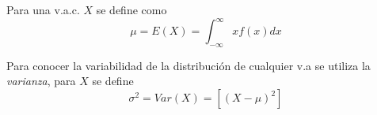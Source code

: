 Para una v.a.c. $X$ se define como
\begin{equation}
\mu=E(X)=\int_{-\infty}^{\infty}xf(x)dx
\end{equation}

Para conocer la variabilidad de la distribución de cualquier v.a se utiliza la \emph{varianza}, para $X$ se define
\begin{equation}
\sigma^2=Var(X)=[{(X-\mu)}^2]
\end{equation}


